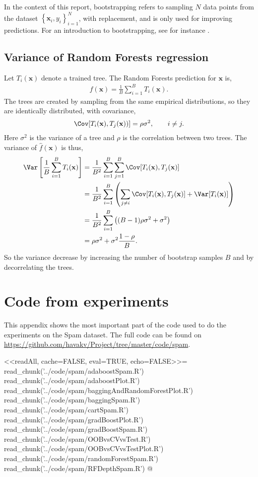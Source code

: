 In the context of this report, bootstrapping refers to sampling $N$ data points from the dataset $\left\{ \mathbf{x}_i, y_i \right\}_{i = 1}^N$, with replacement, and is only used for improving predictions. 
For an introduction to bootstrapping, see for instance \cite{efron1994bootstrap}.


\section{Variance of Random Forests regression}
\label{sec:Variance for Random Forests regression}
Let $T_i(\mathbf{x})$ denote a trained tree. The Random Forests prediction for $\mathbf{x}$ is,
\begin{align}
  \hat f(\mathbf{x}) = \frac{1}{B} \sum_{i = 1}^{B} T_i(\mathbf{x}).
\end{align}
The trees are created by sampling from the same empirical distributions, so they are identically distributed, with covariance,
\begin{align}
  \Cov[T_i(\mathbf{x}), T_j(\mathbf{x}))] = \rho \sigma^2, \quad \quad i \neq j.
\end{align}
Here $\sigma^2$ is the variance of a tree and $\rho$ is the correlation between two trees.  
The variance of $\hat f(\mathbf{x})$ is thus,
\begin{align}
\Var\left[ \frac{1}{B} \sum_{i = 1}^{B} T_i(\mathbf{x}) \right] 
&= \frac{1}{B^2} \sum_{i =1}^B \sum_{j= 1}^B \Cov[T_i(\mathbf{x}), T_j(\mathbf{x})] \notag \\
&= \frac{1}{B^2} \sum_{i =1}^B \left(\sum_{j \neq i} \Cov[T_i(\mathbf{x}), T_j(\mathbf{x})] + \Var[T_i(\mathbf{x})]  \right)\notag \\
&= \frac{1}{B^2} \sum_{i =1}^B \left( (B-1) \rho \sigma^2 + \sigma^2  \right)\notag \\
&= \rho \sigma^2 + \sigma^2 \frac{1-\rho}{B}.
\end{align}
So the variance decrease by increasing the number of bootstrap samples $B$ and by decorrelating the trees.

\chapter{Code from experiments}
\label{chap:Code}
This appendix shows the most important part of the code used to do the experiments on the Spam dataset. The full code can be found on \url{https://github.com/havakv/Project/tree/master/code/spam}.

<<readAll, cache=FALSE, eval=TRUE, echo=FALSE>>=
read_chunk('../code/spam/adaboostSpam.R')
read_chunk('../code/spam/adaboostPlot.R')
read_chunk('../code/spam/baggingAndRandomForestPlot.R')
read_chunk('../code/spam/baggingSpam.R')
read_chunk('../code/spam/cartSpam.R')
read_chunk('../code/spam/gradBoostPlot.R')
read_chunk('../code/spam/gradBoostSpam.R')
read_chunk('../code/spam/OOBvsCVvsTest.R')
read_chunk('../code/spam/OOBvsCVvsTestPlot.R')
read_chunk('../code/spam/randomForestSpam.R')
read_chunk('../code/spam/RFDepthSpam.R')
@

